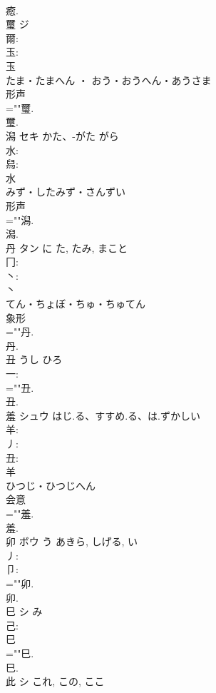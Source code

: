 \documentclass[8pt]{extreport}
\begin{document}
\begin{CJK}{UTF8}{min}
\\	癒.
\\	璽	ジ			
\\	爾: 
\\	玉: 
\\	玉	
\\	たま・たまへん ・ おう・おうへん・あうさま	
\\	形声 
\\	=""璽.
\\	璽.
\\	潟	セキ	かた、-がた	がら	
\\	水: 
\\	舄: 
\\	水	
\\	みず・したみず・さんずい	
\\	形声 
\\	=""潟.
\\	潟.
\\	丹	タン	に	た, たみ, まこと	
\\	冂: 
\\	丶: 
\\	丶	
\\	てん・ちょぼ・ちゅ・ちゅてん	
\\	象形 
\\	=""丹.
\\	丹.
\\	丑		うし	ひろ			
\\	一: 
\\	=""丑.
\\	丑.
\\	羞	シュウ	はじ.る、すすめ.る、は.ずかしい		
\\	羊: 
\\	丿: 
\\	丑: 
\\	羊	
\\	ひつじ・ひつじへん	
\\	会意 
\\	=""羞.
\\	羞.
\\	卯	ボウ	う	あきら, しげる, い	
\\	丿: 
\\	卩: 
\\	=""卯.
\\	卯.
\\	巳	シ	み		
\\	己: 
\\	巳
\\	=""巳.
\\	巳.
\\	此	シ	これ, この, ここ		

\end{CJK}
\end{document}
